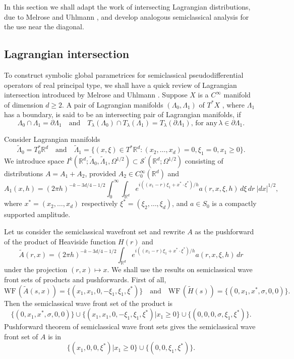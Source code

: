 \documentclass[10pt, a4paper, twoside]{amsart}
\numberwithin{equation}{section}
\theoremstyle{remark}
\begin{document}
\begin{appendix}
	In this section we shall adapt the work of intersecting Lagrangian distributions, due to Melrose and Uhlmann \cite{Melrose-Uhlmann-CPAM-1979}, and develop analogous semiclassical analysis for the use near the diagonal.
	
	\subsection{Lagrangian intersection}
	
	To construct symbolic global parametrices for semiclassical pseudodifferential operators of real principal type, we shall have a quick review of Lagrangian intersection introduced by Melrose and Uhlmann \cite{Melrose-Uhlmann-CPAM-1979}. Suppose $X$ is a $C^\infty$ manifold of dimension $d \geq 2$. A pair of Lagrangian manifolds $(\Lambda_0, \Lambda_1)$ of $T^\ast X$ , where $\Lambda_1$ has a boundary, is said to be an intersecting pair of Lagrangian manifolds, if $$\Lambda_0 \cap \Lambda_1 = \partial \Lambda_1 \quad \mbox{and} \quad T_\lambda(\Lambda_0) \cap T_\lambda(\Lambda_1) = T_\lambda(\partial \Lambda_1), \, \mbox{for any}\, \lambda \in \partial \Lambda_1.$$
	
	Consider Lagrangian manifolds $$\tilde{\Lambda}_0 = T^\ast_0 \mathbb{R}^d  \quad \mbox{and} \quad \tilde{\Lambda}_1 = \{ (x, \xi) \in T^\ast \mathbb{R}^d : (x_2, \dots, x_d) = 0, \xi_1 = 0, x_1 \geq 0 \}.$$ We introduce space $I^k(\mathbb{R}^d; \tilde{\Lambda}_0, \tilde{\Lambda}_1, \Omega^{1/2}) \subset \mathcal{S}^\prime(\mathbb{R}^d; \Omega^{1/2})$ consisting of distributions $A = A_1 + A_2$, provided $A_2 \in C_0^\infty(\mathbb{R}^d)$ and $$A_1(x, h) = (2\pi h)^{-k - 3d/4 - 1/2} \int_0^\infty \int_{\mathbb{R}^d} e^{i((x_1 - r)\xi_1 + x^\ast \cdot \xi^\ast)/h} a(r, x, \xi, h) \, d\xi \, dr  \ |dx|^{1/2}, $$ where $x^\ast = (x_2, \dots, x_d)$ respectively $\xi^\ast = (\xi_2, \dots, \xi_d)$, and $a \in S_0$ is a compactly supported amplitude.
	
	
	Let us consider the semiclassical wavefront set and rewrite $A$ as the pushforward of the product of Heaviside function $H(r)$ and  $$\tilde{A}(r, x) = (2\pi h)^{-k - 3d/4 - 1/2} \int_{\mathbb{R}^d} e^{i((x_1 - r) \xi_1 + x^\ast \cdot \xi^\ast)/h} a(r, x, \xi, h) \,dr$$ under the projection $(r, x) \longmapsto x$. We shall use the results on semiclassical wave front sets of products and pushforwards. First of all, $$\text{WF}\, (\tilde{A}(s, x)) = \{(x_1, x_1, 0, -\xi_1, \xi_1, \xi^\ast)\} \quad \mbox{and} \quad \text{WF}\, (\tilde{H}(s)) = \{(0, x_1, x^\ast, \sigma, 0, 0)\}.$$ Then the semiclassical wave front set of the product is $$\{(0, x_1, x^\ast, \sigma, 0, 0)\} \cup \{(x_1, x_1, 0, -\xi_1, \xi_1, \xi^\ast) | x_1 \geq 0\} \cup \{(0, 0, 0, \sigma, \xi_1, \xi^\ast)\}.$$ Pushforward theorem of semiclassical wave front sets gives the semiclassical wave front set of $A$ is in $$\{(x_1, 0, 0, \xi^\ast) | x_1 \geq 0\} \cup \{(0, 0, \xi_1, \xi^\ast)\}.$$
	

\end{appendix}
\end{document}
